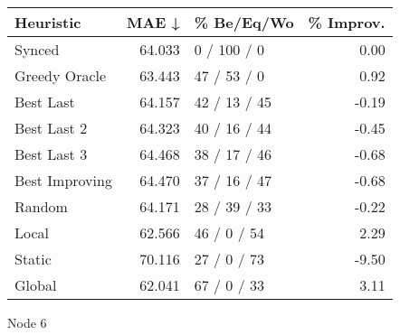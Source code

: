 \begin{tabular}{lrlr}
\toprule
\textbf{Heuristic} & \textbf{MAE ↓} & \textbf{\% Be/Eq/Wo} & \textbf{\% Improv.} \\
\midrule
            Synced &         64.033 &          0 / 100 / 0 &                0.00 \\
     Greedy Oracle &         63.443 &          47 / 53 / 0 &                0.92 \\
         Best Last &         64.157 &         42 / 13 / 45 &               -0.19 \\
       Best Last 2 &         64.323 &         40 / 16 / 44 &               -0.45 \\
       Best Last 3 &         64.468 &         38 / 17 / 46 &               -0.68 \\
    Best Improving &         64.470 &         37 / 16 / 47 &               -0.68 \\
            Random &         64.171 &         28 / 39 / 33 &               -0.22 \\
             Local &         62.566 &          46 / 0 / 54 &                2.29 \\
            Static &         70.116 &          27 / 0 / 73 &               -9.50 \\
            Global &         62.041 &          67 / 0 / 33 &                3.11 \\
\bottomrule
\end{tabular}
\caption{Node 6}
\label{tab:iid_lr05_le1_bs4_6}
